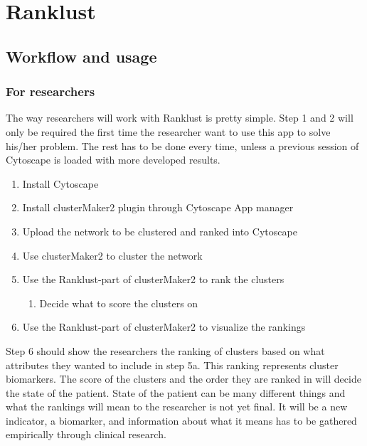\part{Ranklust}
\label{pa:ranklust}
\chapter{Workflow and usage}
\section{For researchers}
The way researchers will work with Ranklust is pretty simple. Step 1 and 2 will
only be required the first time the researcher want to use this app to solve
his/her problem. The rest has to be done every time, unless a previous session
of Cytoscape is loaded with more developed results.

\begin{enumerate}
    \item Install Cytoscape
    \item Install clusterMaker2 plugin through Cytoscape App manager
    \item Upload the network to be clustered and ranked into Cytoscape
    \item Use clusterMaker2 to cluster the network
    \item Use the Ranklust-part of clusterMaker2 to rank the clusters
        \begin{enumerate}
            \item Decide what to score the clusters on
        \end{enumerate}
    \item Use the Ranklust-part of clusterMaker2 to visualize the rankings
\end{enumerate}

Step 6 should show the researchers the ranking of clusters based on what
attributes they wanted to include in step 5a. This ranking represents cluster
biomarkers. The score of the clusters and the order they are ranked in will
decide the state of the patient. State of the patient can be many different
things and what the rankings will mean to the researcher is not yet final. It
will be a new indicator, a biomarker, and information about what it means has to
be gathered empirically through clinical research.

